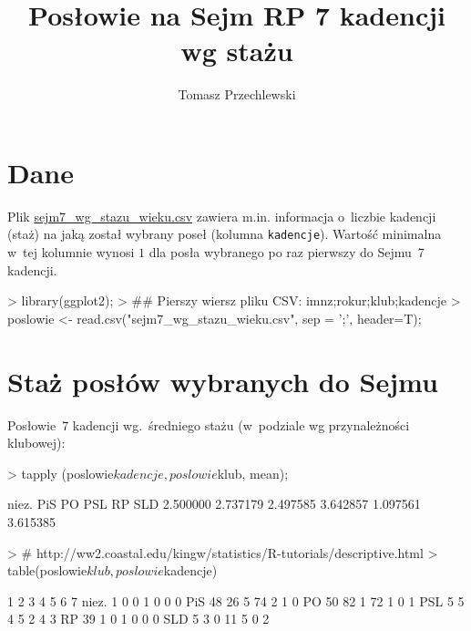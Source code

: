 \documentclass[a4paper]{article}
\title{Posłowie na Sejm RP 7 kadencji wg stażu}
\author{Tomasz Przechlewski}
\begin{document}
\maketitle

\section{Dane}
Plik \url{sejm7_wg_stazu_wieku.csv} zawiera m.in. informacja o~liczbie kadencji (staż)
na jaką został wybrany poseł (kolumna \texttt{kadencje}). 
Wartość minimalna w~tej kolumnie wynosi $1$ dla posła wybranego po raz pierwszy do Sejmu~7 kadencji.

\begin{Schunk}
\begin{Sinput}
> library(ggplot2);
> ## Pierszy wiersz pliku CSV: imnz;rokur;klub;kadencje
> poslowie <- read.csv("sejm7_wg_stazu_wieku.csv", sep = ';',  header=T);
\end{Sinput}
\end{Schunk}


\section{Staż posłów wybranych do Sejmu}

Posłowie~7 kadencji wg.~średniego stażu (w~podziale wg przynależności klubowej):

\begin{Schunk}
\begin{Sinput}
> tapply (poslowie$kadencje, poslowie$klub, mean);
\end{Sinput}
\begin{Soutput}
   niez.      PiS       PO      PSL       RP      SLD 
2.500000 2.737179 2.497585 3.642857 1.097561 3.615385 
\end{Soutput}
\begin{Sinput}
> # http://ww2.coastal.edu/kingw/statistics/R-tutorials/descriptive.html
> table(poslowie$klub, poslowie$kadencje)
\end{Sinput}
\begin{Soutput}
         1  2  3  4  5  6  7
  niez.  1  0  0  1  0  0  0
  PiS   48 26  5 74  2  1  0
  PO    50 82  1 72  1  0  1
  PSL    5  5  4  5  2  4  3
  RP    39  1  0  1  0  0  0
  SLD    5  3  0 11  5  0  2
\end{Soutput}
\end{Schunk}
\end{document}
